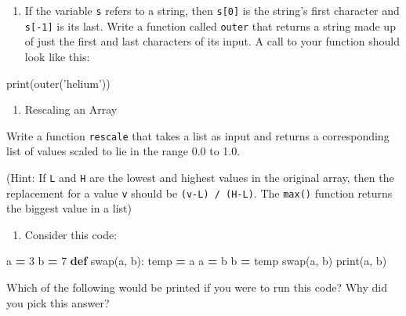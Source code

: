 \documentclass[]{book}
\newenvironment{Shaded}{\begin{snugshade}}{\end{snugshade}}
\newcommand{\BuiltInTok}[1]{#1}
\newcommand{\DecValTok}[1]{\textcolor[rgb]{0.00,0.00,0.81}{#1}}
\newcommand{\KeywordTok}[1]{\textcolor[rgb]{0.13,0.29,0.53}{\textbf{#1}}}
\newcommand{\NormalTok}[1]{#1}
\newcommand{\OperatorTok}[1]{\textcolor[rgb]{0.81,0.36,0.00}{\textbf{#1}}}
\newcommand{\StringTok}[1]{\textcolor[rgb]{0.31,0.60,0.02}{#1}}
\providecommand{\tightlist}{%
  \setlength{\itemsep}{0pt}\setlength{\parskip}{0pt}}
\theoremstyle{definition}
\theoremstyle{definition}
\theoremstyle{definition}
\theoremstyle{remark}
\begin{document}
\begin{enumerate}
\def\labelenumi{\arabic{enumi}.}
\setcounter{enumi}{2}
\tightlist
\item
  If the variable \texttt{s} refers to a string, then \texttt{s{[}0{]}}
  is the string's first character and \texttt{s{[}-1{]}} is its last.
  Write a function called \texttt{outer} that returns a string made up
  of just the first and last characters of its input. A call to your
  function should look like this:
\end{enumerate}

\begin{Shaded}
\begin{Highlighting}[]
\BuiltInTok{print}\NormalTok{(outer(}\StringTok{'helium'}\NormalTok{))}
\end{Highlighting}
\end{Shaded}

\begin{enumerate}
\def\labelenumi{\arabic{enumi}.}
\setcounter{enumi}{3}
\tightlist
\item
  Rescaling an Array
\end{enumerate}

Write a function \texttt{rescale} that takes a list as input and returns
a corresponding list of values scaled to lie in the range 0.0 to 1.0.

(Hint: If \texttt{L} and \texttt{H} are the lowest and highest values in
the original array, then the replacement for a value \texttt{v} should
be \texttt{(v-L)\ /\ (H-L)}. The \texttt{max()} function returns the
biggest value in a list)

\begin{enumerate}
\def\labelenumi{\arabic{enumi}.}
\setcounter{enumi}{4}
\tightlist
\item
  Consider this code:
\end{enumerate}

\begin{Shaded}
\begin{Highlighting}[]
\NormalTok{a }\OperatorTok{=} \DecValTok{3}
\NormalTok{b }\OperatorTok{=} \DecValTok{7}
\KeywordTok{def}\NormalTok{ swap(a, b):}
\NormalTok{    temp }\OperatorTok{=}\NormalTok{ a}
\NormalTok{    a }\OperatorTok{=}\NormalTok{ b}
\NormalTok{    b }\OperatorTok{=}\NormalTok{ temp}
\NormalTok{swap(a, b)}
\BuiltInTok{print}\NormalTok{(a, b)}
\end{Highlighting}
\end{Shaded}

Which of the following would be printed if you were to run this code?
Why did you pick this answer?
\end{document}
